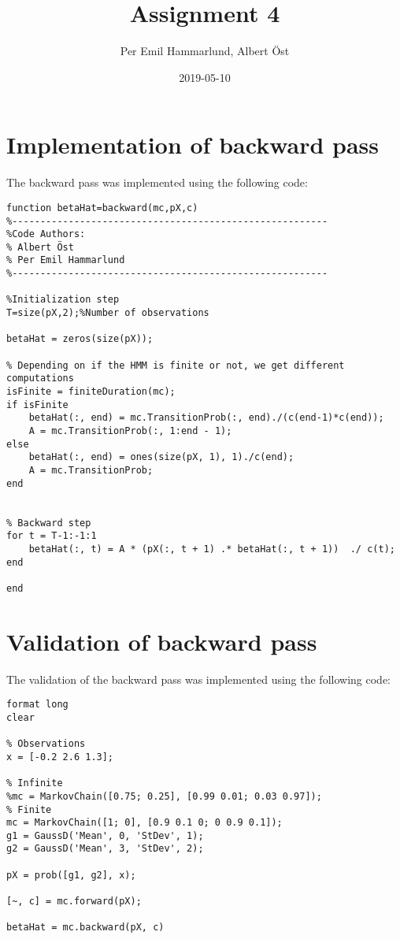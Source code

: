 \documentclass[]{article}
\title{Assignment 4}
\author{Per Emil Hammarlund, Albert Öst}
\date{2019-05-10}
\begin{document}
\maketitle

\tableofcontents

\newpage

\hypertarget{implementation-of-backward-pass}{%
\section{Implementation of backward
pass}\label{implementation-of-backward-pass}}

The backward pass was implemented using the following code:

\begin{verbatim}
function betaHat=backward(mc,pX,c)
%--------------------------------------------------------
%Code Authors:
% Albert Öst
% Per Emil Hammarlund
%--------------------------------------------------------

%Initialization step
T=size(pX,2);%Number of observations

betaHat = zeros(size(pX));

% Depending on if the HMM is finite or not, we get different computations
isFinite = finiteDuration(mc);
if isFinite
    betaHat(:, end) = mc.TransitionProb(:, end)./(c(end-1)*c(end));
    A = mc.TransitionProb(:, 1:end - 1);
else
    betaHat(:, end) = ones(size(pX, 1), 1)./c(end);
    A = mc.TransitionProb;
end


% Backward step
for t = T-1:-1:1
    betaHat(:, t) = A * (pX(:, t + 1) .* betaHat(:, t + 1))  ./ c(t);
end

end
\end{verbatim}

\newpage

\hypertarget{validation-of-backward-pass}{%
\section{Validation of backward
pass}\label{validation-of-backward-pass}}

The validation of the backward pass was implemented using the following
code:

\begin{verbatim}
format long
clear

% Observations
x = [-0.2 2.6 1.3];

% Infinite
%mc = MarkovChain([0.75; 0.25], [0.99 0.01; 0.03 0.97]);
% Finite
mc = MarkovChain([1; 0], [0.9 0.1 0; 0 0.9 0.1]);
g1 = GaussD('Mean', 0, 'StDev', 1);
g2 = GaussD('Mean', 3, 'StDev', 2);

pX = prob([g1, g2], x);

[~, c] = mc.forward(pX);

betaHat = mc.backward(pX, c)
\end{verbatim}
\end{document}

